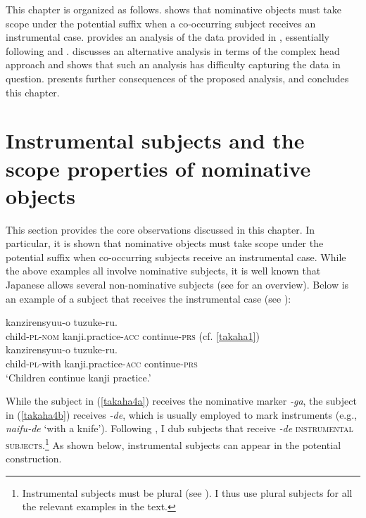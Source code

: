 \documentclass[output=paper]{langscibook}
\begin{document}
This chapter is organized as follows.  shows that nominative objects must take scope under the potential suffix when a co-occurring subject receives an instrumental case.  provides an analysis of the data provided in , essentially following \citet{Kishimoto2010} and \citet{shimamurawurmbrand2014}.  discusses an alternative analysis in terms of the complex head approach and shows that such an analysis has difficulty capturing the data in question.  presents further consequences of the proposed analysis, and  concludes this chapter.

\section{Instrumental subjects and the scope properties of nominative objects} \label{takahas2}

This section provides the core observations discussed in this chapter. In particular, it is shown that nominative objects must take scope under the potential suffix when co-occurring subjects receive an instrumental case. While the above examples all involve nominative subjects, it is well known that Japanese allows several non-nominative subjects (see \citealt{kishimoto2017case} for an overview). Below is an example of a subject that receives the instrumental case (see \citealt{Kishimoto2005,Kishimoto2010, Takubo1984, Inoue1998}):


\begin{exe}
\ex 
\begin{xlist}

\ex \label{takaha4a}
 {kanzirensyuu-o} {tuzuke-ru.}\\
	child-\textsc{pl}-\textsc{nom}  kanji.practice-\textsc{acc} continue-\textsc{prs} (cf. \ref{takaha1})\\ 
	
\ex \label{takaha4b}
 {kanzirensyuu-o} {tuzuke-ru.}\\
	child-\textsc{pl}-with       kanji.practice-\textsc{acc} continue-\textsc{prs}\\
\glt `Children continue kanji practice.' \\
\end{xlist}
\end{exe}

While the subject in (\ref{takaha4a}) receives the nominative marker \emph{-ga}, the subject in (\ref{takaha4b}) receives \emph{-de}, which is usually employed to mark instruments (e.g., \emph{naifu-de} `with a knife’). Following \citet{Kishimoto2005,Kishimoto2010}, I dub subjects that receive \emph{-de} \textsc{instrumental subjects}.\footnote{Instrumental subjects must be plural (see \citealt{Takubo1984, Kishimoto2005, Kishimoto2010}). I thus use plural subjects for all the relevant examples in the text.} As shown below, instrumental subjects can appear in the potential construction.
\end{document}
